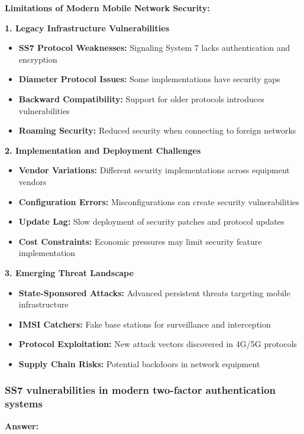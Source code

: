 \documentclass[12pt,a4paper]{article}
\begin{document}
\textbf{Limitations of Modern Mobile Network Security:}

\textbf{1. Legacy Infrastructure Vulnerabilities}
\begin{itemize}
    \item \textbf{SS7 Protocol Weaknesses:} Signaling System 7 lacks authentication and encryption
    \item \textbf{Diameter Protocol Issues:} Some implementations have security gaps
    \item \textbf{Backward Compatibility:} Support for older protocols introduces vulnerabilities
    \item \textbf{Roaming Security:} Reduced security when connecting to foreign networks
\end{itemize}

\textbf{2. Implementation and Deployment Challenges}
\begin{itemize}
    \item \textbf{Vendor Variations:} Different security implementations across equipment vendors
    \item \textbf{Configuration Errors:} Misconfigurations can create security vulnerabilities
    \item \textbf{Update Lag:} Slow deployment of security patches and protocol updates
    \item \textbf{Cost Constraints:} Economic pressures may limit security feature implementation
\end{itemize}

\textbf{3. Emerging Threat Landscape}
\begin{itemize}
    \item \textbf{State-Sponsored Attacks:} Advanced persistent threats targeting mobile infrastructure
    \item \textbf{IMSI Catchers:} Fake base stations for surveillance and interception
    \item \textbf{Protocol Exploitation:} New attack vectors discovered in 4G/5G protocols
    \item \textbf{Supply Chain Risks:} Potential backdoors in network equipment
\end{itemize}

\subsubsection{SS7 vulnerabilities in modern two-factor authentication systems}

\textbf{Answer:}
\end{document}
